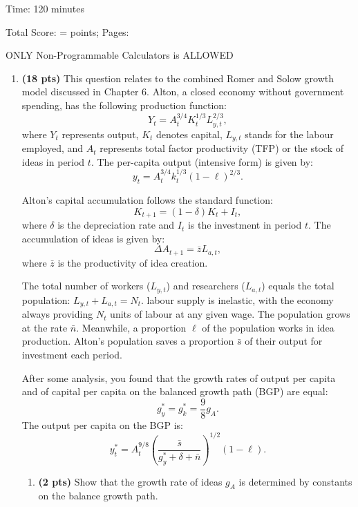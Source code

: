 \documentclass[14pt, oneside]{memoir}
\begin{document}
{{{\begin{center}
{{{{				Time: 120 minutes
				
				Total Score:  =  points; Pages: 
				
				ONLY Non-Programmable Calculators is ALLOWED
	}}}}
	\mbox{}
	\vfill

\end{center}

\quad
\newpage

\begin{enumerate}[label=\textbf{\arabic*.}, itemsep=15pt]

\item \textbf{(18 pts)}\label{P6} This question relates to the combined Romer and Solow growth model discussed in Chapter 6. Alton, a closed economy without government spending, has the following production function:
\[
Y_t = A_t^{3/4} K_t^{1/3} L_{y,t}^{2/3},
\]
where \(Y_t\) represents output, \(K_t\) denotes capital, \(L_{y,t}\) stands for the labour employed, and \(A_t\) represents total factor productivity (TFP) or the stock of ideas in period \(t\). The per-capita output (intensive form) is given by:
\[
y_t = A_t^{3/4} k_t^{1/3} (1-\ell)^{2/3}.
\]

Alton's capital accumulation follows the standard function:
\[
K_{t+1} = (1 - \delta) K_t + I_t,
\]
where \(\delta\) is the depreciation rate and \(I_t\) is the investment in period \(t\). The accumulation of ideas is given by:
\[
\Delta A_{t+1} = \bar{z}L_{a,t},
\]
where \(\bar{z}\) is the productivity of idea creation.

The total number of workers (\(L_{y,t}\)) and researchers (\(L_{a,t}\)) equals the total population: $
L_{y,t} + L_{a,t} = N_t$. 
labour supply is inelastic, with the economy always providing \(N_t\) units of labour at any given wage. The population grows at the rate \(\bar{n}\). Meanwhile, a proportion \(\ell\) of the population works in idea production. Alton's population saves a proportion \(\bar{s}\) of their output for investment each period.

After some analysis, you found that the growth rates of output per capita and of capital per capita on the balanced growth path (BGP) are equal:
\[
g_{y}^* = g_k^* = \frac{9}{8} g_A.
\]
The output per capita on the BGP is:
\[
y_t^{*} = A_t^{9/8} \left(\frac{\bar{s}}{g_y^* + \delta + \bar{n}}\right)^{1/2} (1-\ell).
\]


\clearpage
\begin{enumerate}[label=(\alph*)]
	\item \textbf{(2 pts)} Show that the growth rate of ideas $g_A$ is determined by constants on the balance growth path.
	

\end{enumerate}
\end{enumerate}}}}
\end{document}
